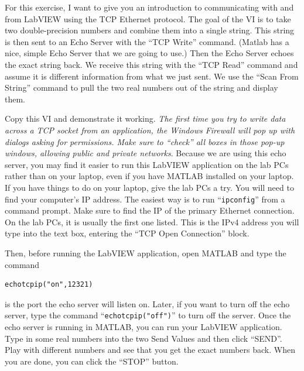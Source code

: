 \documentclass[11pt]{article}
\begin{document}
For this exercise, I want to give you an introduction to communicating with and from LabVIEW using the TCP Ethernet protocol. The goal of the VI is to take two double-precision numbers and combine them into a single string. This string is then sent to an Echo Server with the “TCP Write” command. (Matlab has a nice, simple Echo Server that we are going to use.)  Then the Echo Server echoes the exact string back. We receive this string with the “TCP Read” command and assume it is different information from what we just sent. We use the “Scan From String” command to pull the two real numbers out of the string and display them.

Copy this VI and demonstrate it working. \textit{The first time you try to write data across a TCP socket from an application, the Windows Firewall will pop up with dialogs asking for permissions. Make sure to “check” all boxes in those pop-up windows, allowing public and private networks}. Because we are using this echo server, you may find it easier to run this LabVIEW application on the lab PCs rather than on your laptop, even if you have MATLAB installed on your laptop. If you have things to do on your laptop, give the lab PCs a try. You will need to find your computer's IP address. The easiest way is to run “\verb|ipconfig|” from a command prompt. Make sure to find the IP of the primary Ethernet connection. On the lab PCs, it is usually the first one listed. This is the IPv4 address you will type into the text box, entering the “TCP Open Connection” block.

Then, before running the LabVIEW application, open MATLAB and type the command
%
\begin{verbatim}
echotcpip("on",12321)
\end{verbatim}
%
 is the port the echo server will listen on. Later, if you want to turn off the echo server, type the command “\verb|echotcpip("off")|” to turn off the server. Once the echo server is running in MATLAB, you can run your LabVIEW application. Type in some real numbers into the two Send Values and then click “SEND”. Play with different numbers and see that you get the exact numbers back. When you are done, you can click the “STOP” button.
\end{document}
